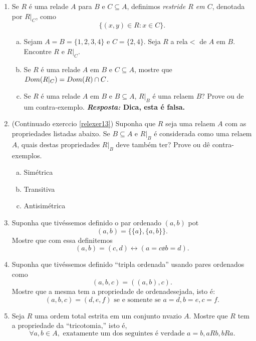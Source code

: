 \begin{enumerate}[{\bf 1.}]
\item\label{relexer13} Se $R$ \'e uma rela\cao de $A$ para $B$ e $C\subseteq A$, definimos {\it restri\cao de $R$ em $C$}, denotada por $R|_C$, como
\[
\{(x,y)\in R: x\in C\}.
\]
\begin{enumerate}[a)]
\item Sejam $A=B=\{1,2,3,4\}$ e $C=\{2,4\}$. Seja $R$ a rela\cao $<$ de $A$ em $B$. Encontre $R$ e $R|_C$. 
\item Se $R$ \'e uma rela\cao de $A$ em $B$ e $C\subseteq A$, mostre que $Dom(R|_C)=Dom(R)\cap C$. 
\item Se $R$ \'e uma rela\cao de $A$ em $B$ e $B\subseteq A$, $R|_B$ \'e uma rela\cao em $B$? Prove ou de um contra-exemplo. {\bf{\it Resposta:} Dica, esta \'e falsa.}
\end{enumerate}

\item (Continua\cao do exerc\ih cio \ref{relexer13}) Suponha que $R$ seja uma rela\cao em $A$ com as propriedades listadas abaixo. Se $B\subseteq A$ e $R|_B$ \'e considerada como uma rela\cao em $A$, quais destas propriedades $R|_B$ deve tamb\'em ter? Prove ou d\^e contra-exemplos.
\begin{enumerate}[a)]
\item Sim\'etrica 
\item Transitiva
\item Antisim\'etrica
\end{enumerate}

\item Suponha que tiv\'essemos definido o par ordenado $(a,b)$ pot
\[
(a,b)=\{\{a\},\{a,b\}\}.
\]
Mostre que com essa defini\cao temos
\[
(a,b)=(c,d)\leftrightarrow(a=c\ee b=d).
\]


\item Suponha que tiv\'essemos definido ``tripla ordenada'' usando pares ordenados como
\[
(a,b,c)=((a,b),c).
\]
Mostre que a mesma tem a propriedade de ordena\cao desejada, isto \'e:
\[
(a,b,c)=(d,e,f)\textrm{ se e somente se }a=d,b=e,c=f.
\]


\item Seja $R$ uma ordem total estrita em um conjunto n\ao vazio $A$. Mostre que $R$ tem a propriedade da ``tricotomia,'' isto \'e,
\[
\forall a,b\in A, \textrm{ exatamente um dos seguintes \'e verdade } a=b, aRb, bRa.
\]



\end{enumerate}
